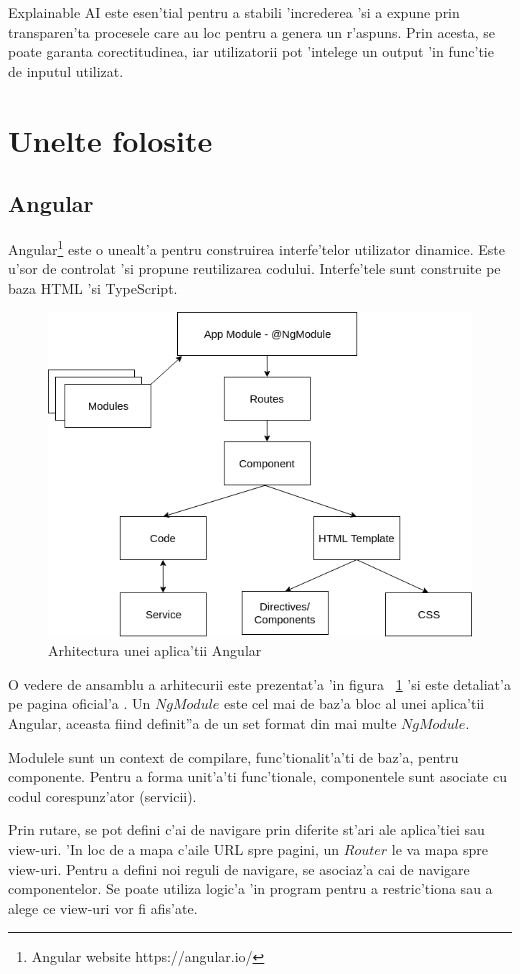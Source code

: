 \documentclass[12pt,a4paper,twoside]{report}
\begin{document}
Explainable AI este esen'tial pentru a stabili 'increderea 'si a expune prin transparen'ta procesele care au loc pentru a genera un r'aspuns. Prin acesta, se poate garanta corectitudinea, iar utilizatorii pot 'intelege un output 'in func'tie de inputul utilizat.

\section{Unelte folosite}
\subsection{Angular}

Angular\footnote{Angular website https://angular.io/} este o unealt'a pentru construirea interfe'telor utilizator dinamice. Este u'sor de controlat 'si propune reutilizarea codului. Interfe'tele sunt construite pe baza HTML 'si TypeScript. 


\begin{figure}
    \centering
    \includegraphics[width = 0.6\linewidth]{img/angular_schema.png}
        \caption{Arhitectura unei aplica'tii Angular}
    \label{fig:ang}
\end{figure}


O vedere de ansamblu a arhitecurii este prezentat'a 'in figura ~\ref{fig:ang} 'si este detaliat'a pe pagina oficial'a \cite{AngularCite}. Un $NgModule$ este cel mai de baz'a bloc al unei aplica'tii Angular, aceasta fiind definit''a de un set format din mai multe $NgModule$.

Modulele sunt un context de compilare, func'tionalit'a'ti de baz'a, pentru componente. Pentru a forma unit'a'ti func'tionale, componentele sunt asociate cu codul corespunz'ator (servicii).

Prin rutare, se pot defini c'ai de navigare prin diferite st'ari ale aplica'tiei sau view-uri. 'In loc de a mapa c'aile URL spre pagini, un $Router$ le va mapa spre view-uri. Pentru a defini noi reguli de navigare, se asociaz'a cai de navigare componentelor. Se poate utiliza logic'a 'in program pentru a restric'tiona sau a alege ce view-uri vor fi afis'ate.
\end{document}
